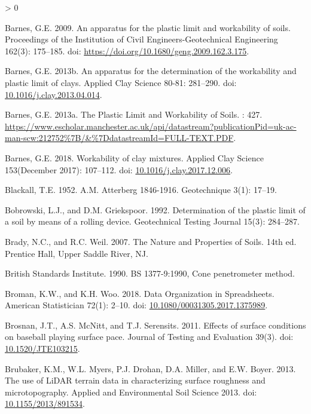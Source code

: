 \documentclass[
  letterpaper,
  openany]{book}
\newlength{\cslhangindent}
\newenvironment{CSLReferences}[2] %
 {%
  \setlength{\parindent}{0pt}
  \ifodd #1 \everypar{\setlength{\hangindent}{\cslhangindent}}\ignorespaces\fi
  \ifnum #2 > 0
  \setlength{\parskip}{#2\baselineskip}
  \fi
 }%
 {}
\begin{document}
\begin{CSLReferences}{1}{0}
\leavevmode\hypertarget{ref-Barnes2009}{}%
Barnes, G.E. 2009. {An apparatus for the plastic limit and workability of soils}. Proceedings of the Institution of Civil Engineers-Geotechnical Engineering 162(3): 175--185. doi: \url{https://doi.org/10.1680/geng.2009.162.3.175}.

\leavevmode\hypertarget{ref-Barnes2013b}{}%
Barnes, G.E. 2013b. {An apparatus for the determination of the workability and plastic limit of clays}. Applied Clay Science 80-81: 281--290. doi: \href{https://doi.org/10.1016/j.clay.2013.04.014}{10.1016/j.clay.2013.04.014}.

\leavevmode\hypertarget{ref-Barnes2013}{}%
Barnes, G.E. 2013a. {The Plastic Limit and Workability of Soils}. : 427. \url{https://www.escholar.manchester.ac.uk/api/datastream?publicationPid=uk-ac-man-scw:212752\%7B/\&\%7DdatastreamId=FULL-TEXT.PDF}.

\leavevmode\hypertarget{ref-Barnes2018}{}%
Barnes, G.E. 2018. {Workability of clay mixtures}. Applied Clay Science 153(December 2017): 107--112. doi: \href{https://doi.org/10.1016/j.clay.2017.12.006}{10.1016/j.clay.2017.12.006}.

\leavevmode\hypertarget{ref-Blackall1952}{}%
Blackall, T.E. 1952. {A.M. Atterberg 1846-1916}. Geotechnique 3(1): 17--19.

\leavevmode\hypertarget{ref-Bobrowski1992}{}%
Bobrowski, L.J., and D.M. Griekspoor. 1992. {Determination of the plastic limit of a soil by means of a rolling device}. Geotechnical Testing Journal 15(3): 284--287.

\leavevmode\hypertarget{ref-Brady2007}{}%
Brady, N.C., and R.C. Weil. 2007. {The Nature and Properties of Soils}. 14th ed. Prentice Hall, Upper Saddle River, NJ.

\leavevmode\hypertarget{ref-BS13771990}{}%
British Standards Institute. 1990. {BS 1377-9:1990, Cone penetrometer method}.

\leavevmode\hypertarget{ref-Broman2018}{}%
Broman, K.W., and K.H. Woo. 2018. {Data Organization in Spreadsheets}. American Statistician 72(1): 2--10. doi: \href{https://doi.org/10.1080/00031305.2017.1375989}{10.1080/00031305.2017.1375989}.

\leavevmode\hypertarget{ref-Brosnan2011}{}%
Brosnan, J.T., A.S. McNitt, and T.J. Serensits. 2011. {Effects of surface conditions on baseball playing surface pace}. Journal of Testing and Evaluation 39(3). doi: \href{https://doi.org/10.1520/JTE103215}{10.1520/JTE103215}.

\leavevmode\hypertarget{ref-Brubaker2013}{}%
Brubaker, K.M., W.L. Myers, P.J. Drohan, D.A. Miller, and E.W. Boyer. 2013. {The use of LiDAR terrain data in characterizing surface roughness and microtopography}. Applied and Environmental Soil Science 2013. doi: \href{https://doi.org/10.1155/2013/891534}{10.1155/2013/891534}.


\end{CSLReferences}
\end{document}
